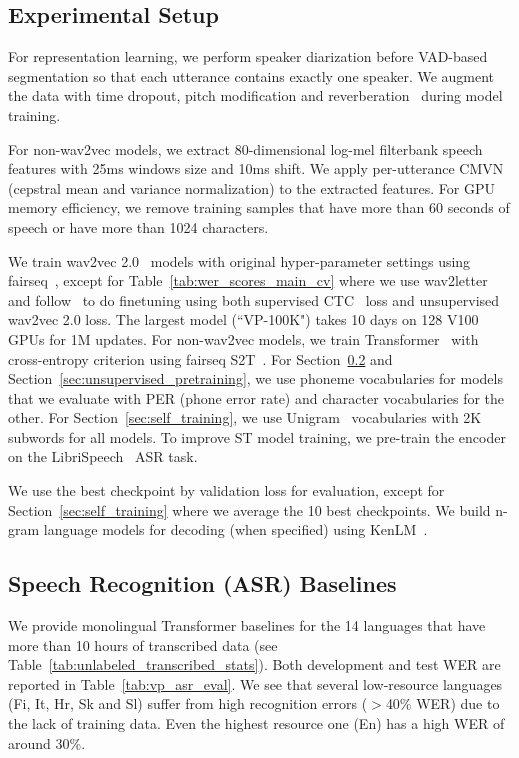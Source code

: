 \subsection{Experimental Setup}
For representation learning, we perform speaker diarization before VAD-based segmentation so that each utterance contains exactly one speaker. We augment the data with time dropout, pitch modification and reverberation~\citep{kharitonov2020data} during model training.

For non-wav2vec models, we extract 80-dimensional log-mel filterbank speech features with 25ms windows size and 10ms shift. We apply per-utterance CMVN (cepstral mean and variance normalization) to the extracted features. For GPU memory efficiency, we remove training samples that have more than 60 seconds of speech or have more than 1024 characters.

We train wav2vec 2.0~\citep{baevski2020wav2vec} models with original hyper-parameter settings using fairseq~\citep{ott2019fairseq}, except for Table~\ref{tab:wer_scores_main_cv} where we use wav2letter~\citep{pratap2018w2l} and follow~\citet{talnikar2020joint} to do finetuning using both supervised CTC~\citep{graves2006ctc} loss and unsupervised wav2vec 2.0 loss. The largest model (``VP-100K") takes 10 days on 128 V100 GPUs for 1M updates. For non-wav2vec models, we train Transformer~\citep{NIPS2017_3f5ee243} with cross-entropy criterion using fairseq S2T~\citep{wang2020fairseqs2t}. For Section~\ref{sec:asr_baselines} and Section~\ref{sec:unsupervised_pretraining}, we use phoneme vocabularies for models that we evaluate with PER (phone error rate) and character vocabularies for the other. For Section~\ref{sec:self_training}, we use Unigram~\cite{kudo-richardson-2018-sentencepiece} vocabularies with 2K subwords for all models. To improve ST model training, we pre-train the encoder on the LibriSpeech~\citep{panayotov2015librispeech} ASR task.

We use the best checkpoint by validation loss for evaluation, except for Section~\ref{sec:self_training} where we average the 10 best checkpoints.
We build n-gram language models for decoding (when specified) using KenLM~\citep{heafield2011kenlm}.

\subsection{Speech Recognition (ASR) Baselines}
\label{sec:asr_baselines}

We provide monolingual Transformer baselines for the 14 languages that have more than 10 hours of transcribed data (see Table~\ref{tab:unlabeled_transcribed_stats}). Both development and test WER are reported in Table~\ref{tab:vp_asr_eval}. We see that several low-resource languages (Fi, It, Hr, Sk and Sl) suffer from high recognition errors ($>$40\% WER) due to the lack of training data. Even the highest resource one (En) has a high WER of around 30\%.


